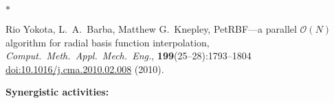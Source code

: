 \documentclass{proposalnsf}
\newlength{\up}
\begin{document}
\begin{list}{$\ast$}{\setlength{\leftmargin}{1em}}
\item Rio Yokota, L.~A.~Barba, Matthew G.~Knepley, Pet\textsc{RBF}---a parallel $\mathcal{O}(N)$ algorithm for radial basis function interpolation, \textit{Comput.\ Meth.\ Appl.\ Mech.\ Eng.}, \textbf{199}(25--28):1793--1804 \\ 
\href{http://dx.doi.org/10.1016/j.cma.2010.02.008}{doi:10.1016/j.cma.2010.02.008} (2010).


\end{list}

\newpage

\textbf{Synergistic activities:} %

\vspace{\up}
\end{document}
